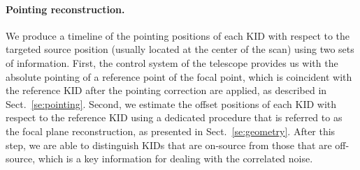 \paragraph{Pointing reconstruction.} 
\label{se:ptg}
We produce a timeline of the pointing positions of each KID with
respect to the targeted source position (usually located at the center of the
scan) using two sets of information. First, the control system of the
telescope provides us with the absolute pointing of a reference point
of the focal point, which is coincident with the reference KID after
the pointing correction are applied, as described in
Sect.~\ref{se:pointing}. Second, we estimate the offset positions of
each KID with respect to the reference KID using a dedicated
procedure that is referred to as the focal plane reconstruction, as
presented in Sect.~\ref{se:geometry}. After this step, we are able to
distinguish KIDs that are on-source from those that are off-source,
which is a key information for dealing with the correlated noise. 
%
%
%
